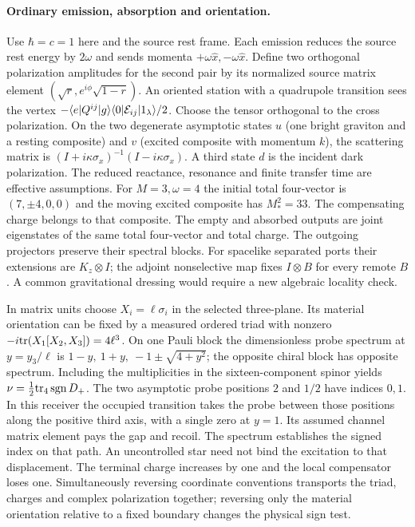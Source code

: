 \paragraph{Ordinary emission, absorption and orientation.}
Use \(\hbar=c=1\) here and the source rest frame. Each emission reduces the source rest energy by \(2\omega\) and sends momenta \(+\omega\hat x,-\omega\hat x\). Define two orthogonal polarization amplitudes for the second pair by its normalized source matrix element \((\sqrt r,e^{i\phi}\sqrt{1-r})\). An oriented station with a quadrupole transition sees the vertex \(-\langle e|Q^{ij}|g\rangle\langle 0|{\cal E}_{ij}|1_\lambda\rangle/2\). Choose the tensor orthogonal to the cross polarization. On the two degenerate asymptotic states \(u\) (one bright graviton and a resting composite) and \(v\) (excited composite with momentum \(k\)), the scattering matrix is \((I+i\kappa\sigma_x)^{-1}(I-i\kappa\sigma_x)\). A third state \(d\) is the incident dark polarization. The reduced reactance, resonance and finite transfer time are effective assumptions. For \(M=3,\omega=4\) the initial total four-vector is \((7,\pm4,0,0)\) and the moving excited composite has \(M_*^2=33\). The compensating charge belongs to that composite. The empty and absorbed outputs are joint eigenstates of the same total four-vector and total charge. The outgoing projectors preserve their spectral blocks. For spacelike separated ports their extensions are \(K_z\otimes I\); the adjoint nonselective map fixes \(I\otimes B\) for every remote \(B\). A common gravitational dressing would require a new algebraic locality check.

In matrix units choose \(X_i=\ell\sigma_i\) in the selected three-plane. Its material orientation can be fixed by a measured ordered triad with nonzero \(-i{\rm tr}(X_1[X_2,X_3])=4\ell^3\). On one Pauli block the dimensionless probe spectrum at \(y=y_3/\ell\) is \(1-y,\ 1+y,\ -1\pm\sqrt{4+y^2}\); the opposite chiral block has opposite spectrum. Including the multiplicities in the sixteen-component spinor yields \(\nu=\tfrac12{\rm tr}_4\,{\rm sgn}\,D_+\). The two asymptotic probe positions \(2\) and \(1/2\) have indices \(0,1\). In this receiver the occupied transition takes the probe between those positions along the positive third axis, with a single zero at \(y=1\). Its assumed channel matrix element pays the gap and recoil. The spectrum establishes the signed index on that path. An uncontrolled star need not bind the excitation to that displacement. The terminal charge increases by one and the local compensator loses one. Simultaneously reversing coordinate conventions transports the triad, charges and complex polarization together; reversing only the material orientation relative to a fixed boundary changes the physical sign test.

